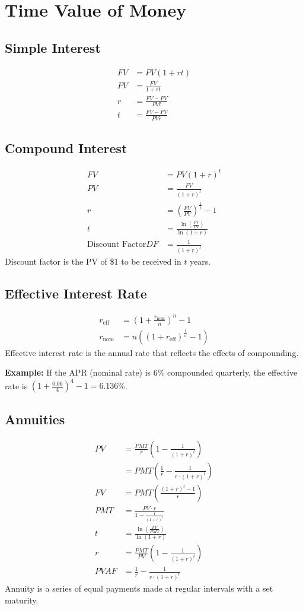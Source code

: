 \section{Time Value of Money}
\subsection{Simple Interest}
\begin{align*}
	FV &= PV(1 + rt) \\
	PV &= \frac{FV}{1 + rt} \\
	r &= \frac{FV - PV}{PVt} \\
	t &= \frac{FV - PV}{PVr}
\end{align*}
\subsection{Compound Interest}
\begin{align*}
	FV &= PV(1 + r)^t \\
	PV &= \frac{FV}{(1 + r)^t} \\
	r &= \left(\frac{FV}{PV}\right)^{\frac{1}{t}} - 1 \\
	t &= \frac{\ln\left(\frac{FV}{PV}\right)}{\ln(1 + r)}\\
	\text{Discount Factor} DF &= \frac{1}{(1 + r)^t}
\end{align*}
Discount factor is the PV of \$1 to be received in $t$ years.
\subsection{Effective Interest Rate}
\begin{align*}
	r_{\text{eff}} &= \left(1 + \frac{r_{\text{nom}}}{n}\right)^n - 1\\
	r_{\text{nom}} &= n\left(\left(1 + r_{\text{eff}}\right)^{\frac{1}{n}} - 1\right)
\end{align*}
Effective interest rate is the annual rate that reflects the effects of compounding.
\begin{callout}
	\textbf{Example:} If the APR (nominal rate) is 6\% compounded quarterly, the effective rate is $(1 + \frac{0.06}{4})^4 - 1 = 6.136\%$.
\end{callout}
\subsection{Annuities}
\begin{align*}
	PV &= \frac{PMT}{r} \left(1 - \frac{1}{(1 + r)^t}\right) \\
	   &= PMT \left(\frac{1}{r} - \frac{1}{r\cdot (1 + r)^t}\right) \\
	FV &= PMT \left(\frac{(1 + r)^t - 1}{r}\right) \\
	PMT &= \frac{PV\cdot r}{1 - \frac{1}{(1 + r)^t}} \\
	t &= \frac{\ln\left(\frac{FV}{PMT}\right)}{\ln(1 + r)} \\
	r &= \frac{PMT}{PV} \left(1 - \frac{1}{(1 + r)^t}\right)\\
PVAF &= \frac{1}{r} - \frac{1}{r\cdot (1 + r)^t}
\end{align*}
Annuity is a series of equal payments made at regular intervals with a set maturity.
